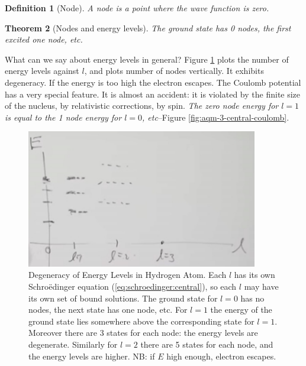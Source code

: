 \documentclass[]{article}
\newtheorem{thm}{Theorem}
\newtheorem{defn}[thm]{Definition}
\begin{document}
\begin{defn}[Node]\label{defn:node}
	A node is a point where the wave function is zero.
\end{defn}

\begin{thm}[Nodes and energy levels]
	The ground state has 0 nodes, the first excited one node, etc.
\end{thm}

What can we say about energy levels in general? Figure \ref{fig:degeneracy:hydrogen} plots the number of energy levels against $l$, and plots number of nodes vertically. It exhibits degeneracy. If the energy is too high the electron escapes. The Coulomb potential has a very special feature. It is almost an accident: it is violated by the finite size of the nucleus, by relativistic corrections, by spin. \emph{The zero node energy for $l=1$ is equal to the 1 node energy for $l=0$, etc}--Figure \ref{fig:aqm-3-central-coulomb}.



\begin{figure}[H]
	\begin{center}
		\caption[Degeneracy of Energy Levels in Hydrogen Atom]{Degeneracy of Energy Levels in Hydrogen Atom. Each $l$ has its own Schro\"edinger equation (\ref{eq:schroedinger:central}), so each $l$ may have its own set of bound solutions. The ground state for $l=0$ has no nodes,  the next state has one node, etc. For $l=1$ the energy of the ground state lies somewhere above the corresponding state for $l=1$. Moreover there are 3 states for each node: the energy levels are degenerate. Similarly for $l=2$ there are 5 states for each node, and the energy levels are higher. NB: if $E$ high enough, electron escapes.}\label{fig:degeneracy:hydrogen}
		\includegraphics[width=0.9\textwidth]{aqm-3-hydrogen-degeneracy}
	\end{center}
\end{figure}
\end{document}

